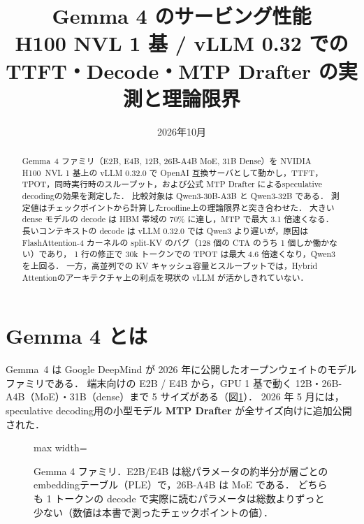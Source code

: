 \documentclass[a4paper,10pt]{ltjsarticle}
\title{Gemma 4 のサービング性能\\[2pt]
\large H100 NVL 1 基 / vLLM 0.32 での TTFT・Decode・MTP Drafter の実測と理論限界}
\author{}
\date{2026年10月}
\begin{document}
\maketitle

\begin{abstract}
Gemma~4 ファミリ（E2B, E4B, 12B, 26B-A4B MoE, 31B Dense）を NVIDIA H100~NVL 1 基上の vLLM 0.32.0 で
OpenAI 互換サーバとして動かし，TTFT，TPOT，同時実行時のスループット，および公式 MTP Drafter によるspeculative decodingの効果を測定した．
比較対象は Qwen3-30B-A3B と Qwen3-32B である．
測定値はチェックポイントから計算したroofline上の理論限界と突き合わせた．
大きい dense モデルの decode は HBM 帯域の 70\% に達し，MTP で最大 3.1 倍速くなる．
長いコンテキストの decode は vLLM 0.32.0 では Qwen3 より遅いが，原因は FlashAttention-4 カーネルの split-KV のバグ（128 個の CTA のうち 1 個しか働かない）であり，
1 行の修正で 30k トークンでの TPOT は最大 4.6 倍速くなり，Qwen3 を上回る．
一方，高並列での KV キャッシュ容量とスループットでは，Hybrid Attentionのアーキテクチャ上の利点を現状の vLLM が活かしきれていない．
\end{abstract}

\tableofcontents
\newpage

\section{Gemma 4 とは}
\label{sec:gemma4}
Gemma~4 は Google DeepMind が 2026 年に公開したオープンウェイトのモデルファミリである\cite{gemma4tr,gemma4card,hfblog}．
端末向けの E2B / E4B から，GPU 1 基で動く 12B・26B-A4B（MoE）・31B（dense）まで 5 サイズがある（図\ref{fig:family}）．
2026 年 5 月には，speculative decoding用の小型モデル \textbf{MTP Drafter} が全サイズ向けに追加公開された\cite{gemma4x,mtpblog}．

\begin{figure}[htbp]\centering
\begin{adjustbox}{max width=\linewidth}\end{adjustbox}
\caption{Gemma 4 ファミリ．E2B/E4B は総パラメータの約半分が層ごとのembeddingテーブル（PLE）で，26B-A4B は MoE である．
どちらも 1 トークンの decode で実際に読むパラメータは総数よりずっと少ない（数値は本書で測ったチェックポイントの値）．}
\label{fig:family}
\end{figure}
\end{document}
